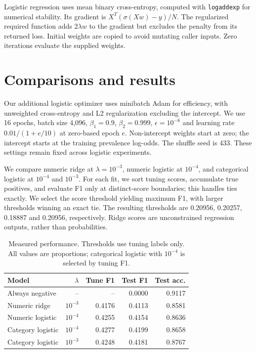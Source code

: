 \documentclass[10pt,conference,compsocconf]{IEEEtran}
\begin{document}
Logistic regression uses mean binary cross-entropy, computed with \texttt{logaddexp} for numerical stability. Its gradient is $X^T(\sigma(Xw)-y)/N$. The regularized required function adds $2\lambda w$ to the gradient but excludes the penalty from its returned loss. Initial weights are copied to avoid mutating caller inputs. Zero iterations evaluate the supplied weights.

\clearpage
\section{Comparisons and results}
Our additional logistic optimizer uses minibatch Adam for efficiency, with unweighted cross-entropy and L2 regularization excluding the intercept. We use 16 epochs, batch size 4,096, $\beta_1=0.9$, $\beta_2=0.999$, $\epsilon=10^{-8}$ and learning rate $0.01/(1+e/10)$ at zero-based epoch $e$. Non-intercept weights start at zero; the intercept starts at the training prevalence log-odds. The shuffle seed is 433. These settings remain fixed across logistic experiments.

We compare numeric ridge at $\lambda=10^{-3}$, numeric logistic at $10^{-4}$, and categorical logistic at $10^{-4}$ and $10^{-3}$. For each fit, we sort tuning scores, accumulate true positives, and evaluate F1 only at distinct-score boundaries; this handles ties exactly. We select the score threshold yielding maximum F1, with larger thresholds winning an exact tie. The resulting thresholds are 0.20956, 0.20257, 0.18887 and 0.20956, respectively. Ridge scores are unconstrained regression outputs, rather than probabilities.

\begin{table}[h]
\centering
\caption{Measured performance. Thresholds use tuning labels only. All values are proportions; categorical logistic with $10^{-4}$ is selected by tuning F1.}
\small
\setlength{\tabcolsep}{3.5pt}
\begin{tabular}{lrrrr}
\toprule
Model & $\lambda$ & Tune F1 & Test F1 & Test acc.\\
\midrule
Always negative & -- & -- & 0.0000 & 0.9117\\
Numeric ridge & $10^{-3}$ & 0.4176 & 0.4113 & 0.8581\\
Numeric logistic & $10^{-4}$ & 0.4255 & 0.4154 & 0.8636\\
Category logistic & $10^{-4}$ & 0.4277 & 0.4199 & 0.8658\\
Category logistic & $10^{-3}$ & 0.4248 & 0.4181 & 0.8767\\
\bottomrule
\end{tabular}
\end{table}
\end{document}
